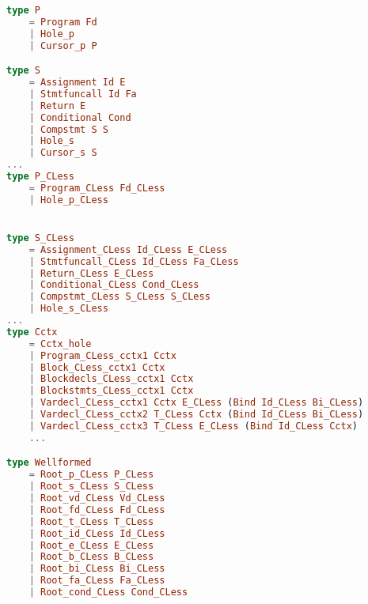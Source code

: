 \begin{lstlisting}[style=inline, language=elm, caption={Generated ADT for the C language}, label={lst:c-adts}]
type P
    = Program Fd
    | Hole_p
    | Cursor_p P

type S
    = Assignment Id E
    | Stmtfuncall Id Fa
    | Return E
    | Conditional Cond
    | Compstmt S S
    | Hole_s
    | Cursor_s S
...
type P_CLess
    = Program_CLess Fd_CLess
    | Hole_p_CLess


type S_CLess
    = Assignment_CLess Id_CLess E_CLess
    | Stmtfuncall_CLess Id_CLess Fa_CLess
    | Return_CLess E_CLess
    | Conditional_CLess Cond_CLess
    | Compstmt_CLess S_CLess S_CLess
    | Hole_s_CLess
...
type Cctx
    = Cctx_hole
    | Program_CLess_cctx1 Cctx
    | Block_CLess_cctx1 Cctx
    | Blockdecls_CLess_cctx1 Cctx
    | Blockstmts_CLess_cctx1 Cctx
    | Vardecl_CLess_cctx1 Cctx E_CLess (Bind Id_CLess Bi_CLess)
    | Vardecl_CLess_cctx2 T_CLess Cctx (Bind Id_CLess Bi_CLess)
    | Vardecl_CLess_cctx3 T_CLess E_CLess (Bind Id_CLess Cctx)
    ...

type Wellformed
    = Root_p_CLess P_CLess
    | Root_s_CLess S_CLess
    | Root_vd_CLess Vd_CLess
    | Root_fd_CLess Fd_CLess
    | Root_t_CLess T_CLess
    | Root_id_CLess Id_CLess
    | Root_e_CLess E_CLess
    | Root_b_CLess B_CLess
    | Root_bi_CLess Bi_CLess
    | Root_fa_CLess Fa_CLess
    | Root_cond_CLess Cond_CLess
\end{lstlisting}

